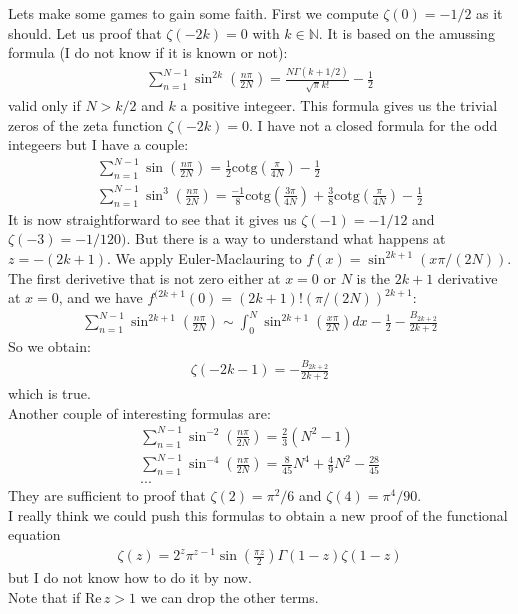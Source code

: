 \documentclass[12pt]{article}
\newcommand\cotg{\mathrm{cotg}}
\def\Re{\mathrm{Re}\,}
\def\NN{\mathbb N}
\begin{document}
Lets make some games to gain some faith. First we compute $\zeta(0)=-1/2$ as it should. Let us proof that $\zeta(-2k)=0$ with $k\in\NN$. It is based on the amussing formula (I do not know if it is known or not):
\begin{gather}
\sum_{n=1}^{N-1} \sin^{2k}\left(\frac{n\pi}{2N}\right)=\frac{N\Gamma(k+1/2)}{\sqrt{\pi}k!}-\frac{1}{2}
\end{gather}
valid only if $N>k/2$ and $k$ a positive integeer. This formula gives us the trivial zeros of the zeta function $\zeta(-2k)=0$. I have not a closed formula for the odd integeers but I have a couple:
\begin{gather}
\sum_{n=1}^{N-1} \sin\left(\frac{n\pi}{2N}\right)=\frac{1}{2}\cotg\left(\frac{\pi}{4N}\right)-\frac{1}{2}\\
\sum_{n=1}^{N-1} \sin^3\left(\frac{n\pi}{2N}\right)=\frac{-1}{8}\cotg\left(\frac{3\pi}{4N}\right)+\frac{3}{8}\cotg\left(\frac{\pi}{4N}\right)-\frac{1}{2}
\end{gather}
It is now straightforward to see that it gives us $\zeta(-1)=-1/12$ and $\zeta(-3)=-1/120)$. But there is a way to understand what happens at $z=-(2k+1)$. We apply Euler-Maclauring to $f(x)=\sin^{2k+1}(x\pi/(2N))$. The first derivetive that is not zero either at $x=0$ or $N$ is the $2k+1$ derivative at $x=0$, and we have $f^{(2k+1}(0)=(2k+1)!(\pi/(2N))^{2k+1}$:
\begin{gather}
\sum_{n=1}^{N-1} \sin^{2k+1}\left(\frac{n\pi}{2N}\right)\sim \int_0^N \sin^{2k+1}\left(\frac{x\pi}{2N}\right) dx-\frac{1}{2}-\frac{B_{2k+2}}{2k+2}
\end{gather}
So we obtain:
\begin{gather}
\zeta(-2k-1)=-\frac{B_{2k+2}}{2k+2}
\end{gather}
which is true.\\
Another couple of interesting formulas are:
\begin{gather}
\sum_{n=1}^{N-1} \sin^{-2}\left(\frac{n\pi}{2N}\right)=\frac{2}{3}\left(N^2-1\right)\\
\sum_{n=1}^{N-1} \sin^{-4}\left(\frac{n\pi}{2N}\right)=\frac{8}{45}N^4+\frac{4}{9}N^2-\frac{28}{45}\\
...
\end{gather}
They are sufficient to proof that $\zeta(2)=\pi^2/6$ and $\zeta(4)=\pi^4/90$.\\
I really think we could push this formulas to obtain a new proof of the functional equation
\begin{gather}
\zeta(z)=2^z\pi^{z-1}\sin\left(\frac{\pi z}{2}\right)\Gamma(1-z)\zeta(1-z)
\end{gather}
but I do not know how to do it by now.\\
Note that if $\Re z>1$ we can drop the other terms.
\end{document}
